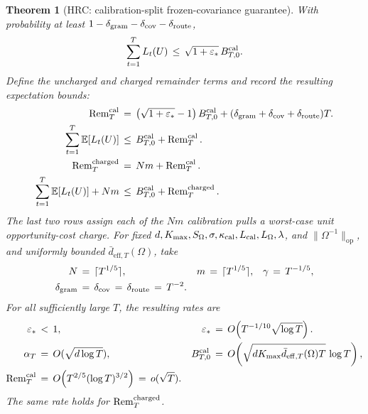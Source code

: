 \documentclass{article} %
\newtheorem{theorem}{Theorem}
\begin{document}
\begin{theorem}[HRC: calibration-split frozen-covariance guarantee]
With probability at least
\(1-\delta_{\rm gram}-\delta_{\rm cov}-\delta_{\rm route}\),
\begin{equation}
\sum_{t=1}^T L_t(U)
\,\leq\,
\sqrt{1+\varepsilon_*}\,B_{T,0}^{\rm cal}.
\end{equation}
Define the uncharged and charged remainder terms and record the resulting
expectation bounds:
\begin{equation}
\begin{aligned}
\operatorname{Rem}_T^{\rm cal}
&\,=\,
\left(\sqrt{1+\varepsilon_*}-1\right)B_{T,0}^{\rm cal}
+
(\delta_{\rm gram}+\delta_{\rm cov}+\delta_{\rm route})T.
\\
\sum_{t=1}^T\mathbb{E}[L_t(U)]
&\,\leq\,
B_{T,0}^{\rm cal}
+
\operatorname{Rem}_T^{\rm cal}.
\\
\operatorname{Rem}_T^{\rm charged}
&\,=\,
Nm+\operatorname{Rem}_T^{\rm cal}.
\\
\sum_{t=1}^T\mathbb E[L_t(U)]+Nm
&\,\leq\,
B_{T,0}^{\rm cal}
+
\operatorname{Rem}_T^{\rm charged}.
\end{aligned}
\end{equation}
The last two rows assign each of the \(Nm\) calibration pulls a worst-case unit
opportunity-cost charge. For fixed
\(d,K_{\max},S_\Omega,\sigma,\kappa_{\rm cal},L_{\rm cal},L_\Omega,\lambda\),
and \(\|\Omega^{-1}\|_{\mathrm{op}}\), and uniformly bounded
\(\bar d_{\mathrm{eff},T}(\Omega)\), take
\begin{equation}
\begin{aligned}
N
&\,=\,
\lceil T^{1/5}\rceil,
&
m
&\,=\,
\lceil T^{1/5}\rceil,
&
\gamma
&\,=\,
T^{-1/5},
\\
\delta_{\rm gram}
&\,=\,
\delta_{\rm cov}
\,=\,
\delta_{\rm route}
\,=\,
T^{-2}.
\end{aligned}
\end{equation}
For all sufficiently large \(T\), the resulting rates are
\begin{equation}
\begin{aligned}
\varepsilon_*
&\,<\,
1,
&
\varepsilon_*
&\,=\,
O\!\left(T^{-1/10}\sqrt{\log T}\right).
\\
\alpha_T
&\,=\,
O(\sqrt{d\log T}),
&
B_{T,0}^{\rm cal}
&\,=\,
O\!\left(
\sqrt{dK_{\max}\bar d_{\mathrm{eff},T}(\Omega)T}\,\log T
\right),
\\
\operatorname{Rem}_T^{\rm cal}
&\,=\,
O\!\left(T^{2/5}(\log T)^{3/2}\right)
\,=\,
o(\sqrt{T}).
\end{aligned}
\end{equation}
The same rate holds for
\(\operatorname{Rem}_T^{\rm charged}\).
\end{theorem}
\end{document}
